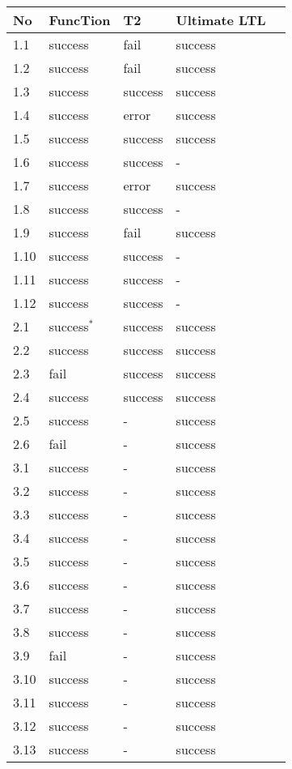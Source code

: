 \documentclass[11pt,a4paper,titlepage]{article}
\theoremstyle{definition}
\begin{document}
\begin{table}
\scriptsize\begin{tabular}{l l l l l}
    \textbf{No} & \textbf{FuncTion} & \textbf{T2} & \textbf{Ultimate LTL}  \\
    \hline
    1.1 & success & fail & success \\
    1.2 & success & fail & success \\
    1.3 & success & success & success \\
    1.4 & success & error & success \\
    1.5 & success & success & success \\
    1.6 & success & success & - \\
    1.7 & success & error & success \\
    1.8 & success & success & - \\
    1.9 & success & fail & success \\
    1.10 & success & success & - \\
    1.11 & success & success & - \\
    1.12 & success & success & - \\
    \hline
    2.1 & success$^*$ & success & success \\
    2.2 & success & success & success \\
    2.3 & fail & success & success \\
    2.4 & success & success & success \\
    2.5 & success & - & success \\
    2.6 & fail & - & success \\
    \hline
    3.1 & success & - & success \\
    3.2 & success & - & success \\
    3.3 & success & - & success \\
    3.4 & success & - & success \\
    3.5 & success & - & success \\
    3.6 & success & - & success \\
    3.7 & success & - & success \\
    3.8 & success & - & success \\
    3.9 & fail & - & success \\
    3.10 & success & - & success \\
    3.11 & success & - & success \\
    3.12 & success & - & success \\
    3.13 & success & - & success \\

\end{tabular}
\end{table}
\end{document}
